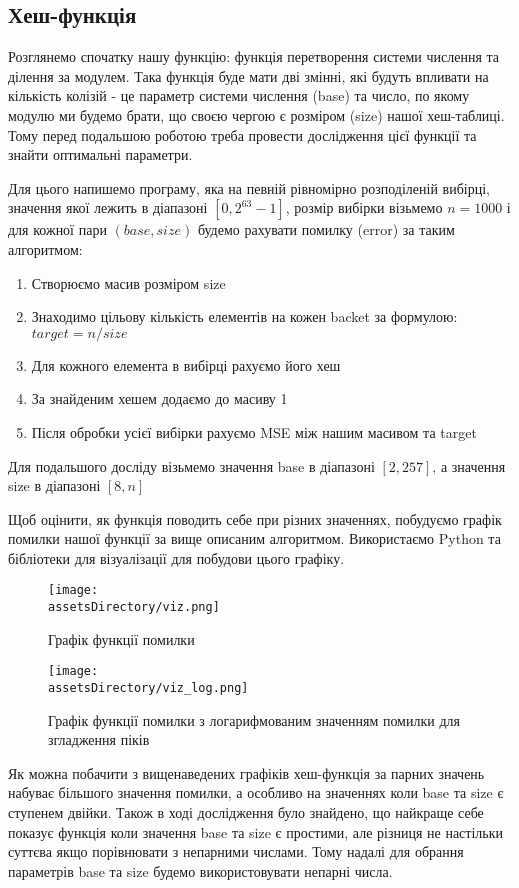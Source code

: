 \newpage
\subsection{Хеш-функція}
Розглянемо спочатку нашу функцію: функція перетворення системи числення та ділення за модулем.
Така функція буде мати дві змінні, які будуть впливати на кількість колізій - це параметр системи числення (base) та число, по якому модулю ми будемо брати,
що своєю чергою є розміром (size) нашої хеш-таблиці.
Тому перед подальшою роботою треба провести дослідження цієї функції та знайти оптимальні параметри.

Для цього напишемо програму, яка на певній рівномірно розподіленій вибірці, значення якої лежить в діапазоні $[0, 2^{63} - 1]$,
розмір вибірки візьмемо $n = 1000$ і для кожної пари $(base, size)$ будемо рахувати помилку (error) за таким алгоритмом:
\begin{enumerate}
    \item Створюємо масив розміром size
    \item Знаходимо цільову кількість елементів на кожен backet за формулою: $target = n / size$
    \item Для кожного елемента в вибірці рахуємо його хеш
    \item За знайденим хешем додаємо до масиву 1
    \item Після обробки усієї вибірки рахуємо MSE між нашим масивом та target
\end{enumerate}
Для подальшого досліду візьмемо значення base в діапазоні $[2, 257]$, а значення size в діапазоні $[8, n]$

Щоб оцінити, як функція поводить себе при різних значеннях, побудуємо графік помилки нашої функції за вище описаним алгоритмом.
Використаємо Python та бібліотеки для візуалізації для побудови цього графіку.

\begin{figure}[ht!]
    \centering
    \texttt{[image: \\assetsDirectory/viz.png]}
    \caption{Графік функції помилки}
\end{figure}

\begin{figure}[ht!]
    \centering
    \texttt{[image: \\assetsDirectory/viz\_log.png]}
    \caption{Графік функції помилки з логарифмованим значенням помилки для згладження піків}
\end{figure}

Як можна побачити з вищенаведених графіків хеш-функція за парних значень набуває більшого значення помилки,
а особливо на значеннях коли base та size є ступенем двійки. Також в ході дослідження було знайдено,
що найкраще себе показує функція коли значення base та size є простими,
але різниця не настільки суттєва якщо порівнювати з непарними числами.
Тому надалі для обрання параметрів base та size будемо використовувати непарні числа.

